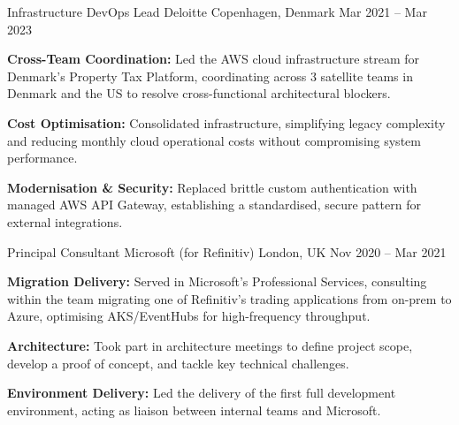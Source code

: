 \begin{cventries}
  \cventry
  {Infrastructure DevOps Lead}
  {Deloitte}
  {Copenhagen, Denmark}
  {Mar 2021 -- Mar 2023}
  {
    \begin{cvitems}
      \item {\textbf{Cross-Team Coordination:} Led the AWS cloud infrastructure stream for Denmark's Property Tax Platform, coordinating
                across 3 satellite teams in Denmark and the US to resolve cross-functional architectural blockers.}
      \item {\textbf{Cost Optimisation:} Consolidated infrastructure, simplifying legacy complexity and reducing monthly cloud
                operational costs without compromising system performance.}
      \item {\textbf{Modernisation \& Security:} Replaced brittle custom authentication with managed AWS API Gateway, establishing
                a standardised, secure pattern for external integrations.}
    \end{cvitems}
  }

  \cventry
  {Principal Consultant}
  {Microsoft (for Refinitiv)}
  {London, UK}
  {Nov 2020 -- Mar 2021}
  {
    \begin{cvitems}
      \item {\textbf{Migration Delivery:} Served in Microsoft's Professional Services, consulting within the team migrating one of Refinitiv's trading applications from on-prem to Azure, optimising AKS/EventHubs for high-frequency throughput.}
      \item {\textbf{Architecture:} Took part in architecture meetings to define project scope, develop a proof of concept, and tackle key technical challenges.}
      \item {\textbf{Environment Delivery:} Led the delivery of the first full development environment, acting as liaison between internal teams and Microsoft.}
    \end{cvitems}
  }


\end{cventries}
